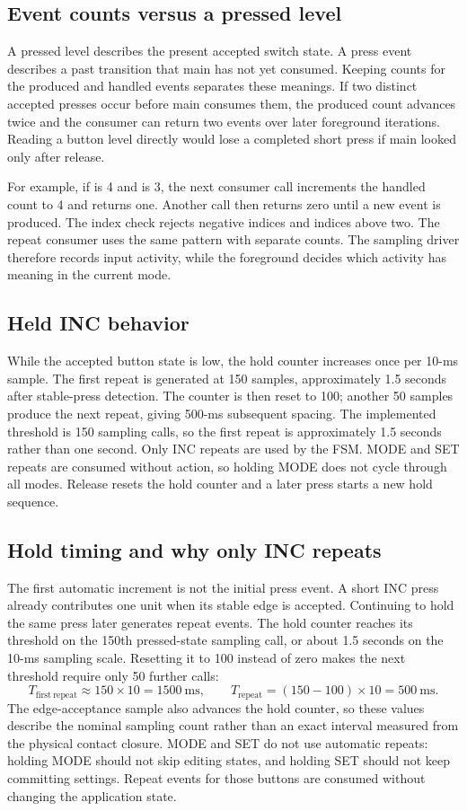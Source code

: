 \documentclass[a4paper]{article}
\newcommand{\code}[1]{\texttt{\detokenize{#1}}}
\newcommand{\topic}[1]{\subsection{#1}}
\begin{document}
\topic{Event counts versus a pressed level}

A pressed level describes the present accepted switch state. A press event
describes a past transition that main has not yet consumed. Keeping counts
for the produced and handled events separates these meanings. If two distinct
accepted presses occur before main consumes them, the produced count advances
twice and the consumer can return two events over later foreground iterations.
Reading a button level directly would lose a completed short press if main
looked only after release.

For example, if \code{press_count[0]} is 4 and
\code{handled_count[0]} is 3, the next consumer call increments the handled
count to 4 and returns one. Another call then returns zero until a new event
is produced. The index check rejects negative indices and indices above two.
The repeat consumer uses the same pattern with separate counts. The sampling
driver therefore records input activity, while the foreground decides which
activity has meaning in the current mode.


\topic{Held INC behavior}
While the accepted button state is low, the hold counter increases once per
10-ms sample. The first repeat is generated at 150 samples, approximately
1.5 seconds after stable-press detection. The counter is then reset to 100;
another 50 samples produce the next repeat, giving 500-ms subsequent spacing.
The implemented threshold is 150 sampling calls, so the first repeat is
approximately 1.5 seconds rather than one second.
Only INC repeats are used by the FSM. MODE and SET repeats are consumed
without action, so holding MODE does not cycle through all modes.
Release resets the hold counter and a later press starts a new hold sequence.

\topic{Hold timing and why only INC repeats}

The first automatic increment is not the initial press event. A short INC
press already contributes one unit when its stable edge is accepted.
Continuing to hold the same press later generates repeat events. The hold
counter reaches its threshold on the 150th pressed-state sampling call, or
about 1.5 seconds on the 10-ms sampling scale. Resetting it to 100 instead
of zero makes the next threshold require only 50 further calls:
\[
T_{\mathrm{first\ repeat}}\approx150\times10=1500\ \mathrm{ms},
\qquad T_{\mathrm{repeat}}=(150-100)\times10=500\ \mathrm{ms}.
\]
The edge-acceptance sample also advances the hold counter, so these values
describe the nominal sampling count rather than an exact interval measured
from the physical contact closure. MODE and SET do not use automatic repeats:
holding MODE should not skip editing states, and holding SET should not keep
committing settings. Repeat events for those buttons are consumed without
changing the application state.
\end{document}
